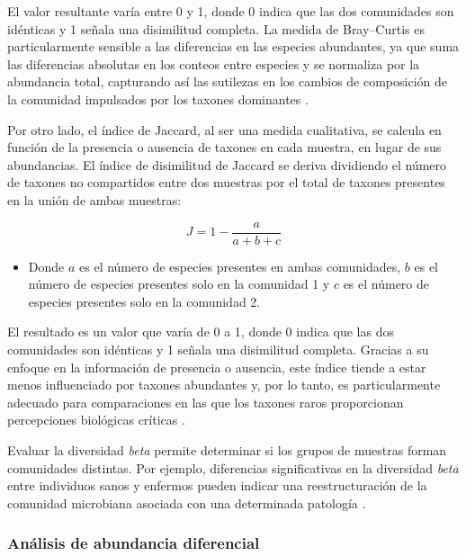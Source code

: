 El valor resultante varía entre 0 y 1, donde 0 indica que las dos comunidades son idénticas y 1 señala una disimilitud completa. La medida de Bray–Curtis es particularmente sensible a las diferencias en las especies abundantes, ya que suma las diferencias absolutas en los conteos entre especies y se normaliza por la abundancia total, capturando así las sutilezas en los cambios de composición de la comunidad impulsados por los taxones dominantes \cite{kers2022power}.

Por otro lado, el índice de Jaccard, al ser una medida cualitativa, se calcula en función de la presencia o ausencia de taxones en cada muestra, en lugar de sus abundancias. El índice de disimilitud de Jaccard se deriva dividiendo el número de taxones no compartidos entre dos muestras por el total de taxones presentes en la unión de ambas muestras:

\begin{equation}
J = 1 - \frac{a}{a + b + c}
\end{equation}
\begin{itemize}
\item Donde $a$ es el número de especies presentes en ambas comunidades, $b$ es el número de especies presentes solo en la comunidad 1 y $c$ es el número de especies presentes solo en la comunidad 2.
\end{itemize}

El resultado es un valor que varía de 0 a 1, donde 0 indica que las dos comunidades son idénticas y 1 señala una disimilitud completa. Gracias a su enfoque en la información de presencia o ausencia, este índice tiende a estar menos influenciado por taxones abundantes y, por lo tanto, es particularmente adecuado para comparaciones en las que los taxones raros proporcionan percepciones biológicas críticas \cite{kers2022power}. 
 
Evaluar la diversidad \textit{beta} permite determinar si los grupos de muestras forman comunidades distintas. Por ejemplo, diferencias significativas en la diversidad \textit{beta} entre individuos sanos y enfermos pueden indicar una reestructuración de la comunidad microbiana asociada con una determinada patología \cite{finotello2018measuring}.



\subsubsection{Análisis de abundancia diferencial}


